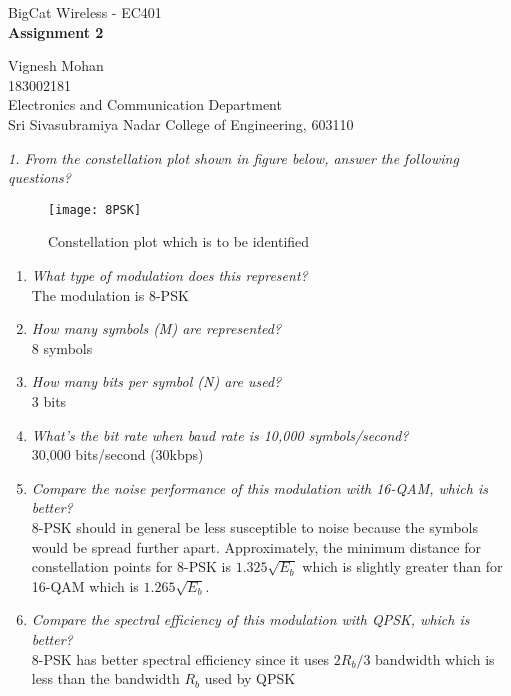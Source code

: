 \documentclass[a4paper]{article}
\begin{document}

\Large
 \begin{center}
BigCat Wireless - EC401\\
\textbf{Assignment 2}

\hspace{10pt}

\large
Vignesh Mohan\\
\smallskip
\small
183002181\\
\small
Electronics and Communication Department\\
\small
Sri Sivasubramiya Nadar College of Engineering, 603110\\
\end{center}

\hspace{10pt}
\normalsize

\textit{1. From the constellation plot shown in figure below, answer the following questions?}\\
\bigskip
\begin{figure}[hbt!]
  \centering
  \texttt{[image: 8PSK]}
  \caption{Constellation plot which is to be identified}
\end{figure}
\begin{enumerate}
  \item \textit{What type of modulation does this represent?}\\
  The modulation is 8-PSK\\
  \item \textit{How many symbols (M) are represented?}\\
  8 symbols
  \item \textit{How many bits per symbol (N) are used?}\\
  3 bits
  \item \textit{What’s the bit rate when baud rate is 10,000 symbols/second?}\\
  30,000 bits/second (30kbps)
  \item \textit{Compare the noise performance of this modulation with 16-QAM, which is better?}\\
  8-PSK should in general be less susceptible to noise because the symbols would be spread further apart. Approximately, the minimum distance for constellation points for 8-PSK is  $1.325\sqrt{E_b}$ which is slightly greater than for 16-QAM which is $1.265\sqrt{E_b}$.
  \item \textit{Compare the spectral efficiency of this modulation with QPSK, which is better?}\\
  8-PSK has better spectral efficiency since it uses $2R_b/3$ bandwidth which is less than the bandwidth $R_b$ used by QPSK
\end{enumerate}
\end{document}
